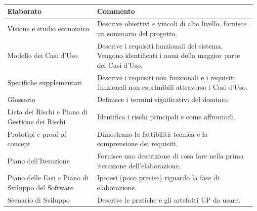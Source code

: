 
\begin{center}
    \begin{tabular}{ || >{\columncolor{mgray}}p{8cm} | >{\columncolor{GreenPastel}}p{8cm} ||}
    \hline\hline
        \rowcolor{lightgray}
    \textbf{Elaborato}& \textbf{\textcolor{dkgreen}{Commento}}\\ \hline
    \hline
        Visione e studio economico & Descrive obiettivi e vincoli di alto livello, fornisce un sommario del progetto.\\ \hline

        Modello dei Casi d'Uso & Descrive i requisiti funzionali del sistema. Vengono identificati i nomi della maggior parte dei Casi d'Uso.\\ \hline

        Specifiche supplementari & Descrive i requisiti non funzionali e i requisiti funzionali non esprimibili attraverso i Casi d'Uso.\\ \hline

        Glossario & Definisce i termini significativi del dominio.\\ \hline

        Lista dei Rischi e Piano di Gestione dei Rischi & Identifica i rischi principali e come affrontarli.\\ \hline

        Prototipi e proof of concept & Dimostrano la fattibilità tecnica e la comprensione dei requisiti.\\ \hline

        Piano dell'Iterazione & Fornisce una descrizione di cosa fare nella prima iterazione dell'elaborazione.\\ \hline

        Piano delle Fasi e Piano di Sviluppo del Software & Ipotesi (poco precise) riguardo la fase di elaborazione.\\ \hline 
    
        Scenario di Sviluppo & Descrive le pratiche e gli artefatti UP da usare.\\ \hline
    
        \hline

    \end{tabular}
\end{center}

